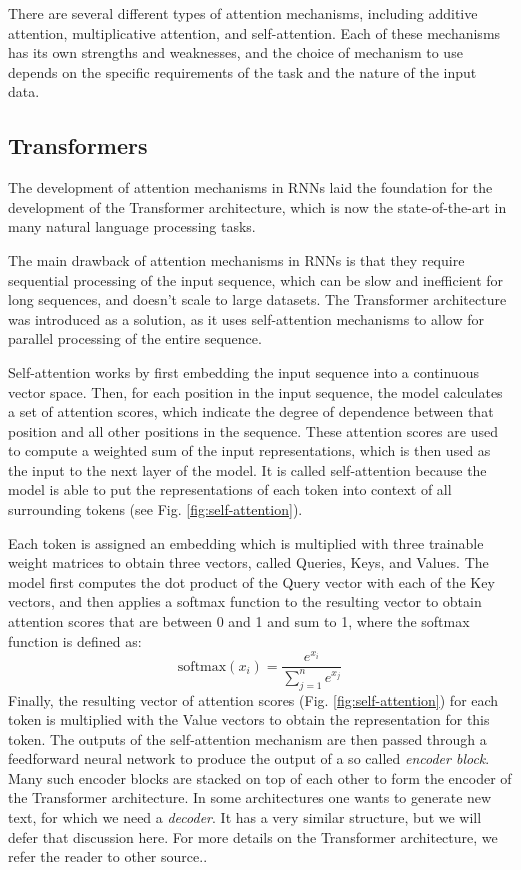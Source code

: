 There are several different types of attention mechanisms, including additive attention, multiplicative attention, and self-attention. Each of these mechanisms has its own strengths and weaknesses, and the choice of mechanism to use depends on the specific requirements of the task and the nature of the input data.


\subsection{Transformers}
The development of attention mechanisms in RNNs laid the foundation for the development of the Transformer architecture, which is now the state-of-the-art in many natural language processing tasks.

The main drawback of attention mechanisms in RNNs is that they require sequential processing of the input sequence, which can be slow and inefficient for long sequences, and doesn't scale to large datasets.
The Transformer architecture was introduced as a solution, as it uses self-attention mechanisms to allow for parallel processing of the entire sequence.

Self-attention works by first embedding the input sequence into a continuous vector space. Then, for each position in the input sequence, the model calculates a set of attention scores, which indicate the degree of dependence between that position and all other positions in the sequence. These attention scores are used to compute a weighted sum of the input representations, which is then used as the input to the next layer of the model.
It is called self-attention because the model is able to put the representations of each token into context of all surrounding tokens (see Fig. \ref{fig:self-attention}).

Each token is assigned an embedding which is multiplied with three trainable weight matrices to obtain three vectors, called Queries, Keys, and Values.
The model first computes the dot product of the Query vector with each of the Key vectors, and then applies a softmax function to the resulting vector to obtain attention scores that are between 0 and 1 and sum to 1, where the softmax function is defined as:
\begin{equation}
    \text{softmax}(x_i) = \frac{e^{x_i}}{\sum_{j=1}^{n} e^{x_j}}
\end{equation}
Finally, the resulting vector of attention scores (Fig. \ref{fig:self-attention}) for each token is multiplied with the Value vectors to obtain the representation for this token.
The outputs of the self-attention mechanism are then passed through a feedforward neural network to produce the output of a so called \textit{encoder block}.
Many such encoder blocks are stacked on top of each other to form the encoder of the Transformer architecture.
In some architectures one wants to generate new text, for which we need a \textit{decoder}.
It has a very similar structure, but we will defer that discussion here.
For more details on the Transformer architecture, we refer the reader to other source.\cite{https://doi.org/10.48550/arxiv.1706.03762}\cite{illustratedtransformer}.

